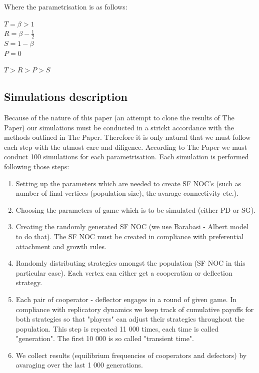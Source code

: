 \documentclass[english, twoside, 12pt, a4paper]{article}
\theoremstyle{definition}
\theoremstyle{plain}
\theoremstyle{remark}
\begin{document}
  Where the parametrisation is as follows:\\
  \begin{center}
  \(T = \beta > 1 \)\\
  \(R = \beta - \frac{1}{2} \)\\
  \(S = 1 - \beta \)\\
  \(P = 0 \)
  

  \begin{center}
    \( T > R > P > S \)
  \end{center}


  \end{center}

\subsection{Simulations description}

Because of the nature of this paper (an attempt to clone the results of The Paper) our simulations must be conducted in a strickt accordance with the methods outlined
in The Paper. Therefore it is only natural that we must follow each step with the utmost care and diligence. According to The Paper we must conduct 100 simulations 
for each parametrisation. Each simulation is performed following those steps:\\
\begin{enumerate}
  \item Setting up the parameters which are needed to create SF NOC's (such as number of final vertices (population size), the avarage connectivity etc.).
  \item Choosing the parameters of game which is to be simulated (either PD or SG).
  \item Creating the randomly generated SF NOC (we use Barabasi - Albert model to do that). The SF NOC must be created in compliance with preferential attachment and 
  growth rules.
  \item Randomly distributing strategies amongst the population (SF NOC in this particular case). Each vertex can either get a cooperation or deflection strategy.
  \item Each pair of cooperator - deflector engages in a round of given game. In compliance with replicatory dynamics we keep track of cumulative payoffs for both 
  strategies so that "players" can adjust their strategies throughout the population. This step is repeated 11 000 times, each time is called "generation". The first 
  10 000 is so called "transient time".
  \item We collect results (equilibrium frequencies of cooperators and defectors) by avaraging over the last 1 000 generations.
\end{enumerate}
\end{document}

